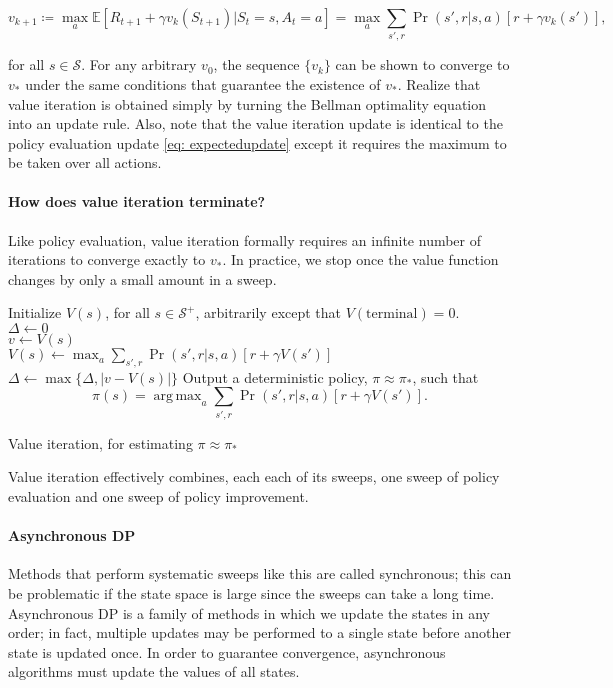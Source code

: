 \documentclass[12pt]{article}
\DeclareMathOperator*{\argmax}{arg\,max}
\begin{document}
\begin{equation}
  v_{k+1} \coloneqq \max_a \mathbb E \left[ R_{t+1} + \gamma v_k(S_{t+1}) | S_t = s , A_t = a \right] = \max_a \sum_{s',r} \Pr(s',r|s,a) \left[ r + \gamma v_k(s')\right],
\end{equation}

for all $s \in \mathcal S$. For any arbitrary $v_0$, the sequence $\{v_k\}$ can be shown to converge to $v_*$ under the same conditions that guarantee the existence of $v_*$. Realize that value iteration is obtained simply by turning the Bellman optimality equation into an update rule. Also, note that the value iteration update is identical to the policy evaluation update \ref{eq:     expectedupdate} except it requires the maximum to be taken over all actions.

\paragraph{How does value iteration terminate?} Like policy evaluation, value iteration formally requires an infinite number of iterations to converge exactly to $v_*$. In practice, we stop once the value function changes by only a small amount in a sweep.

\begin{algorithm}[h]
  Initialize $V(s)$, for all $s \in \mathcal S^+$, arbitrarily except that   $V(\textrm{terminal}) = 0$. \\
\Do{$\Delta < \theta$} {
  $\Delta \gets 0$ \\
   {
    $v \gets V(s)$ \\
    $V(s) \gets \max_a \sum_{s',r} \Pr(s',r|s,a)\left[r+\gamma V(s')\right]$ \\    $\Delta \gets \max\{\Delta, |v-V(s)|\}$
  }
}
Output a deterministic policy, $\pi \approx \pi_*$, such that
\[
  \pi(s) = \argmax_a \sum_{s',r} \Pr(s',r|s,a) \left[ r + \gamma V(s')\right].
\]
\caption{Value iteration, for estimating $\pi \approx \pi_*$}
\end{algorithm}

Value iteration effectively combines, each each of its sweeps, one sweep of policy evaluation and one sweep of policy improvement.

\paragraph{Asynchronous DP}
Methods that perform systematic sweeps like this are called synchronous; this can be problematic if the state space is large since the sweeps can take a long time. Asynchronous DP is a family of methods in which we update the states in any order; in fact, multiple updates may be performed to a single state before another state is updated once. In order to guarantee convergence, asynchronous algorithms must update the values of all states.
\end{document}
